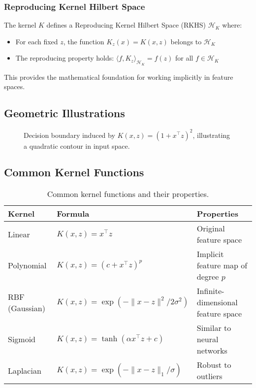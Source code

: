 \documentclass[11pt]{article}
\begin{document}
\subsubsection{Reproducing Kernel Hilbert Space}
The kernel $K$ defines a Reproducing Kernel Hilbert Space (RKHS) $\mathcal{H}_K$ where:
\begin{itemize}
    \item For each fixed $z$, the function $K_z(x) = K(x,z)$ belongs to $\mathcal{H}_K$
    \item The reproducing property holds: $\langle f, K_z \rangle_{\mathcal{H}_K} = f(z)$ for all $f \in \mathcal{H}_K$
\end{itemize}
This provides the mathematical foundation for working implicitly in feature spaces.

\subsection{Geometric Illustrations}
\begin{figure}[h]
  \centering
  \caption{Decision boundary induced by $K(x,z)=(1+x^\top z)^2$, illustrating a quadratic contour in input space.}
\end{figure}

\subsection{Common Kernel Functions}
\begin{table}[h]
  \centering
  \begin{tabular}{|l|l|l|}
    \hline
    \textbf{Kernel} & \textbf{Formula} & \textbf{Properties} \\
    \hline
    Linear & $K(x,z) = x^\top z$ & Original feature space \\
    \hline
    Polynomial & $K(x,z) = (c + x^\top z)^p$ & Implicit feature map of degree $p$ \\
    \hline
    RBF (Gaussian) & $K(x,z) = \exp(-\|x-z\|^2/2\sigma^2)$ & Infinite-dimensional feature space \\
    \hline
    Sigmoid & $K(x,z) = \tanh(\alpha x^\top z + c)$ & Similar to neural networks \\
    \hline
    Laplacian & $K(x,z) = \exp(-\|x-z\|_1/\sigma)$ & Robust to outliers \\
    \hline
  \end{tabular}
  \caption{Common kernel functions and their properties.}
\end{table}
\end{document}
